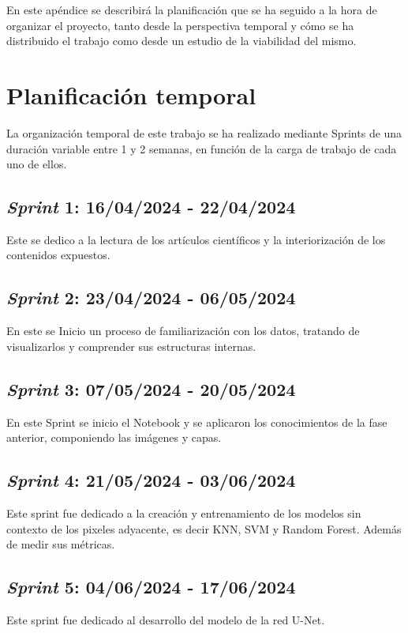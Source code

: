 
En este apéndice se describirá la planificación que se ha seguido a la hora de organizar el proyecto, tanto desde la perspectiva temporal y cómo se ha distribuido el trabajo como desde un estudio de la viabilidad del mismo.

\section{Planificación temporal}

La organización temporal de este trabajo se ha realizado mediante Sprints de una duración variable entre 1 y 2 semanas, en función de la carga de trabajo de cada uno de ellos.

\subsection{\textit{Sprint} 1: 16/04/2024 - 22/04/2024}
Este se dedico a la lectura de los artículos científicos y la interiorización de los contenidos expuestos.

\subsection{\textit{Sprint} 2: 23/04/2024 - 06/05/2024}
En este se Inicio un proceso de familiarización con los datos, tratando de visualizarlos y comprender sus estructuras internas.

\subsection{\textit{Sprint} 3: 07/05/2024 - 20/05/2024}
En este Sprint se inicio el Notebook y se aplicaron los conocimientos de la fase anterior, componiendo las imágenes y capas.

\subsection{\textit{Sprint} 4: 21/05/2024 - 03/06/2024}
Este sprint fue dedicado a la creación y entrenamiento de los modelos sin contexto de los pixeles adyacente, es decir KNN, SVM y Random Forest. Además de medir sus métricas.

\subsection{\textit{Sprint} 5: 04/06/2024 - 17/06/2024}
Este sprint fue dedicado al desarrollo del modelo de la red U-Net.

